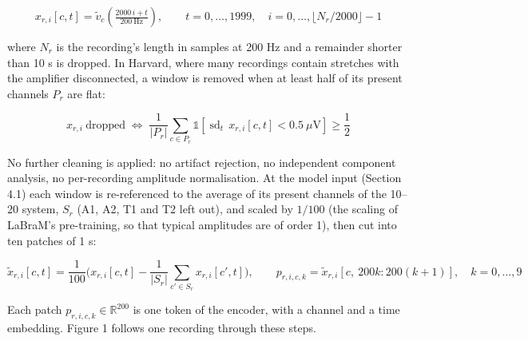 \documentclass[11pt,a4paper]{article}
\begin{document}
\begin{equation}
x_{r,i}[c, t] = \tilde v_c\!\left(\tfrac{2000\,i + t}{200\ \mathrm{Hz}}\right), \qquad t = 0, \dots, 1999, \quad i = 0, \dots, \lfloor N_r / 2000 \rfloor - 1 \tag{3}
\end{equation}

where $N_r$ is the recording's length in samples at 200 Hz and a remainder shorter than 10 s is dropped. In Harvard, where many recordings contain stretches with the amplifier disconnected, a window is removed when at least half of its present channels $P_r$ are flat:

\begin{equation}
x_{r,i}\ \text{dropped} \;\Leftrightarrow\; \frac{1}{\lvert P_r \rvert} \sum_{c \in P_r} \mathbb{1}\!\left[\operatorname{sd}_t\, x_{r,i}[c,t] < 0.5\ \mu\mathrm{V}\right] \ge \frac{1}{2} \tag{4}
\end{equation}

No further cleaning is applied: no artifact rejection, no independent component analysis, no per-recording amplitude normalisation. At the model input (Section 4.1) each window is re-referenced to the average of its present channels of the 10--20 system, $S_r$ (A1, A2, T1 and T2 left out), and scaled by $1/100$ (the scaling of LaBraM's pre-training, so that typical amplitudes are of order 1), then cut into ten patches of 1 s:

\begin{equation}
\tilde x_{r,i}[c,t] = \frac{1}{100} \Big( x_{r,i}[c,t] - \frac{1}{\lvert S_r \rvert} \sum_{c' \in S_r} x_{r,i}[c',t] \Big), \qquad p_{r,i,c,k} = \tilde x_{r,i}[c,\ 200k : 200(k+1)], \quad k = 0, \dots, 9 \tag{5}
\end{equation}

Each patch $p_{r,i,c,k} \in \mathbb{R}^{200}$ is one token of the encoder, with a channel and a time embedding. Figure 1 follows one recording through these steps.
\end{document}
